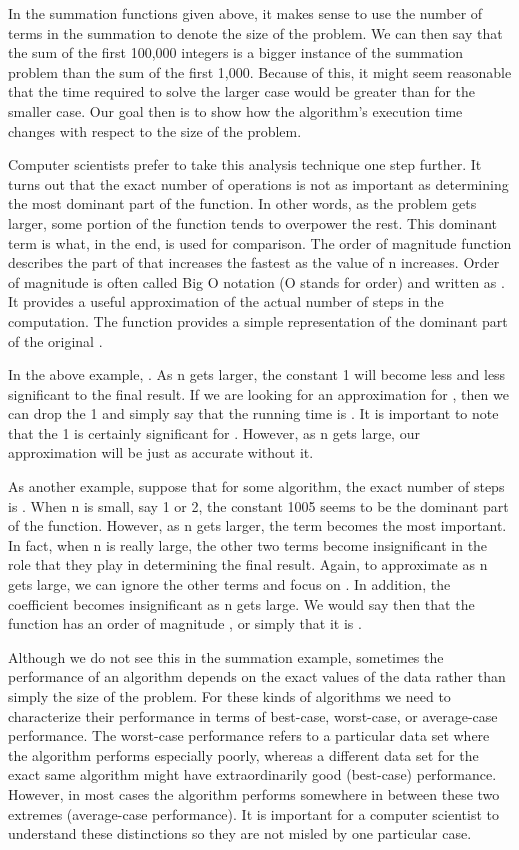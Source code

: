 In the summation functions given above, it makes sense to use the number of terms in the summation to denote the size of the problem. We can then say that the sum of the first 100,000 integers is a bigger instance of the summation problem than the sum of the first 1,000. Because of this, it might seem reasonable that the time required to solve the larger case would be greater than for the smaller case. Our goal then is to show how the algorithm’s execution time changes with respect to the size of the problem.

Computer scientists prefer to take this analysis technique one step further. It turns out that the exact number of operations is not as important as determining the most dominant part of the
function. In other words, as the problem gets larger, some portion of the function tends to overpower the rest. This dominant term is what, in the end, is used for comparison. The order of magnitude function describes the part of that increases the fastest as the value of n increases. Order of magnitude is often called Big O notation (O stands for order) and written as . It provides a useful approximation of the actual number of steps in the computation. The function provides a simple representation of the dominant part of the original .

In the above example, . As n gets larger, the constant 1 will become less and less significant to the final result. If we are looking for an approximation for , then we can drop the 1 and simply say that the running time is . It is important to note that the 1 is certainly significant for .
However, as n gets large, our approximation will be just as accurate without it.

As another example, suppose that for some algorithm, the exact number of steps is .
When n is small, say 1 or 2, the constant 1005 seems to be the dominant part of the function. However, as n gets larger, the term becomes the most important. In fact, when n is really large, the other two terms become insignificant in the role that they play in determining the final result. Again, to approximate as n gets large, we can ignore the other terms and focus on . In addition, the coefficient becomes insignificant as n gets large. We would say then that the function has an order of magnitude , or simply that it is .

Although we do not see this in the summation example, sometimes the performance of an algorithm depends on the exact values of the data rather than simply the size of the problem. For these kinds of algorithms we need to characterize their performance in terms of best-case, worst-case, or average-case performance. The worst-case performance refers to a particular data set where the algorithm performs especially poorly, whereas a different data set for the exact same algorithm might have extraordinarily good (best-case) performance. However, in most cases the algorithm performs somewhere in between these two extremes (average-case performance). It is important for a computer scientist to understand these distinctions so they are not misled by one particular case.


